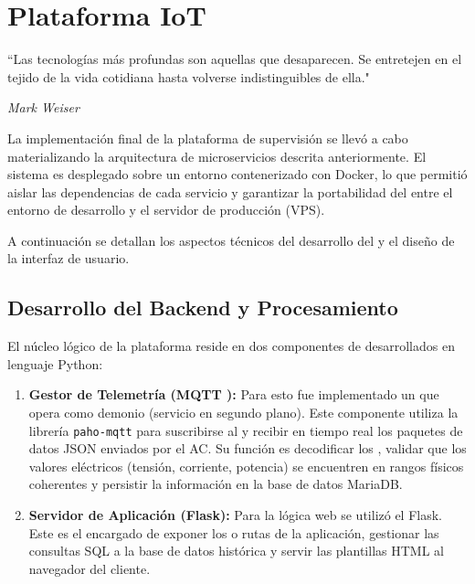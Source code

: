 \cleardoublepage
\chapter{Plataforma IoT}
\epigraph{``Las tecnologías más profundas son aquellas que desaparecen. Se
entretejen en el tejido de la vida cotidiana hasta volverse indistinguibles de
ella."}{\textit{Mark Weiser}}
La implementación final de la plataforma de supervisión se llevó a cabo materializando la arquitectura de microservicios descrita anteriormente. El sistema es desplegado sobre un entorno contenerizado con Docker, lo que permitió aislar las dependencias de cada servicio y garantizar la portabilidad del  entre el entorno de desarrollo y el servidor de producción (VPS).

A continuación se detallan los aspectos técnicos del desarrollo del  y el diseño de la interfaz de usuario.

\section{Desarrollo del Backend y Procesamiento}

El núcleo lógico de la plataforma reside en dos componentes de  desarrollados en lenguaje Python:

\begin{enumerate}
    \item \textbf{Gestor de Telemetría (MQTT ):} Para esto fue implementado un  que opera como demonio (servicio en segundo plano). Este componente utiliza la librería \texttt{paho-mqtt} para suscribirse al  y recibir en tiempo real los paquetes de datos JSON enviados por el AC. Su función es decodificar los , validar que los valores eléctricos (tensión, corriente, potencia) se encuentren en rangos físicos coherentes y persistir la información en la base de datos MariaDB.
    
    \item \textbf{Servidor de Aplicación (Flask):} Para la lógica web se utilizó el  Flask. Este es el encargado de exponer los  o rutas de la aplicación, gestionar las consultas SQL a la base de datos histórica y servir las plantillas HTML al navegador del cliente.
\end{enumerate}

